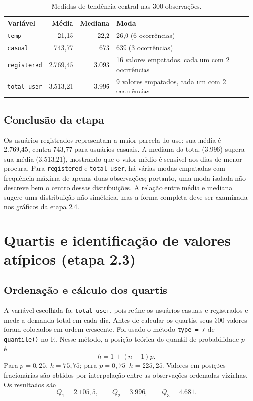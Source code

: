 \documentclass[12pt,a4paper]{article}
\begin{document}
\begin{table}[H]
\centering\small
\caption{Medidas de tendência central nas 300 observações.}
\begin{tabular}{lrrp{5.5cm}}
\toprule
Variável & Média & Mediana & Moda \\
\midrule
\texttt{temp} & 21,15 & 22,2 & 26,0 (6 ocorrências) \\
\texttt{casual} & 743,77 & 673 & 639 (3 ocorrências) \\
\texttt{registered} & 2.769,45 & 3.093 & 16 valores empatados, cada um com 2 ocorrências \\
\texttt{total\_user} & 3.513,21 & 3.996 & 9 valores empatados, cada um com 2 ocorrências \\
\bottomrule
\end{tabular}
\end{table}

\subsection{Conclusão da etapa}

Os usuários registrados representam a maior parcela do uso: sua média é
2.769,45, contra 743,77 para usuários casuais. A mediana do total (3.996)
supera sua média (3.513,21), mostrando que o valor médio é sensível aos dias
de menor procura. Para \texttt{registered} e \texttt{total\_user}, há várias
modas empatadas com frequência máxima de apenas duas observações; portanto,
uma moda isolada não descreve bem o centro dessas distribuições. A relação
entre média e mediana sugere uma distribuição não simétrica, mas a forma
completa deve ser examinada nos gráficos da etapa 2.4.

\section{Quartis e identificação de valores atípicos (etapa 2.3)}

\subsection{Ordenação e cálculo dos quartis}

A variável escolhida foi \texttt{total\_user}, pois reúne os usuários
casuais e registrados e mede a demanda total em cada dia. Antes de calcular
os quartis, seus 300 valores foram colocados em ordem crescente. Foi usado o
método \texttt{type = 7} de \texttt{quantile()} no R. Nesse método, a posição
teórica do quantil de probabilidade $p$ é
\begin{equation}
h=1+(n-1)p.
\end{equation}
Para $p=0{,}25$, $h=75{,}75$; para $p=0{,}75$, $h=225{,}25$.
Valores em posições fracionárias são obtidos por interpolação entre as
observações ordenadas vizinhas. Os resultados são
\begin{equation}
Q_1=2.105{,}5,\qquad Q_2=3.996,\qquad Q_3=4.681.
\end{equation}
\end{document}

